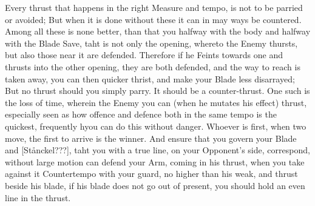 Every thrust that happens in the right Measure and tempo, is not to be
parried or avoided; But when it is done without these it can in may
ways be countered. Among all these is none better, than that you
halfway with the body and halfway with the Blade Save, taht is not
only the opening, whereto the Enemy thursts, but also those near it
are defended. Therefore if he Feints towards one and thrusts into the
other opening, they are both defended, and the way to reach is taken
away, you can then quicker thrist, and make your Blade less
disarrayed; But no thrust should you simply parry. It should be a
counter-thrust.
One such is the loss of time, wherein the Enemy you can (when he mutates
his effect) thrust, especially seen as how offence and defence both in
the same tempo is the quickest, frequently hyou can do this without
danger. Whoever is first, when two move, the first to arrive is the winner.
And ensure that you govern your Blade and [Stånckel???], taht you with
a true line, on your Opponent's side, correspond, without large motion
can defend your Arm, coming in his thrust, when you take against it
Countertempo with your guard, no higher than his weak, and thrust
beside his blade, if his blade does not go out of present, you should
hold an even line in the thrust.

